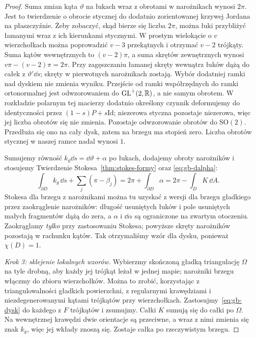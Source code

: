 \begin{proof}
Suma zmian kąta $\vartheta$ na łukach wraz z obrotami
w narożnikach wynosi $2\pi$. Jest to twierdzenie o
obrocie stycznej do dodatnio zorientowanej krzywej
Jordana na płaszczyźnie. Żeby zobaczyć, skąd bierze się
liczba $2\pi$, można łuki przybliżyć łamanymi wraz z
ich kierunkami stycznymi. W prostym wielokącie o $v$
wierzchołkach można poprowadzić $v-3$ przekątnych
i otrzymać $v-2$ trójkąty. Suma kątów wewnętrznych
to $(v-2)\pi$, a suma skrętów zewnętrznych wynosi
$v\pi-(v-2)\pi=2\pi$. Przy zagęszczaniu łamanej skręty
wewnątrz łuków dążą do całek z $\vartheta'\dd s$;
skręty w pierwotnych narożnikach zostają. Wybór
dodatniej ramki nad dyskiem nie zmienia wyniku. Przejście
od ramki współrzędnych do ramki ortonormalnej jest odwzorowaniem
do $\mathrm{GL}^+(2,\mathbb{R})$, a nie samym obrotem. W rozkładzie
polarnym tej macierzy dodatnio określony czynnik deformujemy
do identyczności przez $(1-s)P+s\mathrm{Id}$; niezerowa
styczna pozostaje niezerowa, więc jej liczba obrotów się
nie zmienia. Pozostaje odwzorowanie obrotów do $\mathrm{SO}(2)$.
Przedłuża się ono na cały dysk, zatem na brzegu ma stopień
zero. Liczba obrotów stycznej w naszej ramce nadal wynosi $1$.

Sumujemy równość $k_g\dd s=\dd\vartheta+\alpha$
po łukach, dodajemy obroty narożników i stosujemy
Twierdzenie Stokesa~\ref{thm:stokes-formy} oraz
\eqref{eq:gb-dalpha}:
\begin{equation}\label{eq:gb-dysk}
 \int_{\partial D}k_g\,\dd s
 +\sum_j(\pi-\beta_j)
 =2\pi+\int_{\partial D}\alpha
 =2\pi-\int_D K\,\dd A.
\end{equation}
Stokesa dla brzegu z narożnikami można tu uzyskać
z wersji dla brzegu gładkiego przez zaokrąglenie
narożników: długość usuniętych łuków i pole usuniętych
małych fragmentów dążą do zera, a $\alpha$ i $\dd\alpha$
są ograniczone na zwartym otoczeniu. Zaokrąglamy
\emph{tylko} przy zastosowaniu Stokesa; powyższe
skręty narożników pozostają w rachunku kątów.
Tak otrzymaliśmy wzór dla dysku, ponieważ $\chi(D)=1$.

\emph{Krok 3: sklejenie lokalnych wzorów.}
Wybierzmy skończoną gładką triangulację $\Omega$ na tyle
drobną, aby każdy jej trójkąt leżał w jednej mapie;
narożniki brzegu włączmy do zbioru wierzchołków.
Można to zrobić, korzystając z triangulowalności
gładkich powierzchni, z regularnymi krawędziami i
niezdegenerowanymi kątami trójkątów przy wierzchołkach. Zastosujmy~\eqref{eq:gb-dysk}
do każdego z $F$ trójkątów i zsumujmy. Całki $K$
sumują się do całki po $\Omega$. Na wewnętrznej
krawędzi dwie orientacje są przeciwne, a wraz z nimi
zmienia się znak $k_g$, więc jej wkłady znoszą się.
Zostaje całka po rzeczywistym brzegu.


\end{proof}
